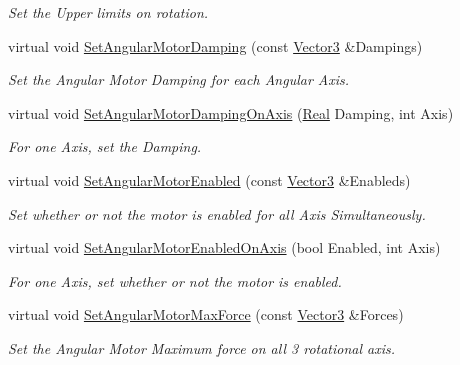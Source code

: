\begin{DoxyCompactItemize}
\begin{DoxyCompactList}\small\item\em Set the Upper limits on rotation. \item\end{DoxyCompactList}\item 
virtual void \hyperlink{classphys_1_1Generic6DofConstraint_aec7a765d3c4cc39c1463dcf4a76a1428}{SetAngularMotorDamping} (const \hyperlink{classphys_1_1Vector3}{Vector3} \&Dampings)
\begin{DoxyCompactList}\small\item\em Set the Angular Motor Damping for each Angular Axis. \item\end{DoxyCompactList}\item 
virtual void \hyperlink{classphys_1_1Generic6DofConstraint_aa0ee16bfe1d7b461481118caa935c41a}{SetAngularMotorDampingOnAxis} (\hyperlink{namespacephys_af7eb897198d265b8e868f45240230d5f}{Real} Damping, int Axis)
\begin{DoxyCompactList}\small\item\em For one Axis, set the Damping. \item\end{DoxyCompactList}\item 
virtual void \hyperlink{classphys_1_1Generic6DofConstraint_a25ee52759a22ccf7a5ed4a3bfdcd6186}{SetAngularMotorEnabled} (const \hyperlink{classphys_1_1Vector3}{Vector3} \&Enableds)
\begin{DoxyCompactList}\small\item\em Set whether or not the motor is enabled for all Axis Simultaneously. \item\end{DoxyCompactList}\item 
virtual void \hyperlink{classphys_1_1Generic6DofConstraint_a78b9af18d7ac31b822bf5911e47f8dc0}{SetAngularMotorEnabledOnAxis} (bool Enabled, int Axis)
\begin{DoxyCompactList}\small\item\em For one Axis, set whether or not the motor is enabled. \item\end{DoxyCompactList}\item 
virtual void \hyperlink{classphys_1_1Generic6DofConstraint_aec2cb441ebc330314fcb3c32204d4270}{SetAngularMotorMaxForce} (const \hyperlink{classphys_1_1Vector3}{Vector3} \&Forces)
\begin{DoxyCompactList}\small\item\em Set the Angular Motor Maximum force on all 3 rotational axis. \item\end{DoxyCompactList}\item 

\end{DoxyCompactItemize}
